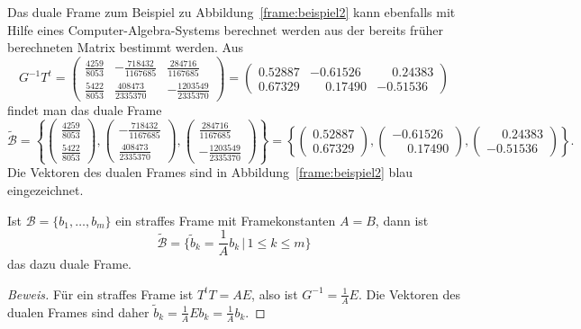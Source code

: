\begin{beispiel}
Das duale Frame zum Beispiel zu Abbildung~\ref{frame:beispiel2} kann
ebenfalls mit Hilfe eines Computer-Algebra-Systems berechnet werden aus
der bereits früher berechneten Matrix bestimmt werden.
Aus 
\[
G^{-1}T^t
=
\begin{pmatrix}
\frac{4259}{8053}
	&-\frac{718432}{1167685}
		&\frac{284716}{1167685}\\[2pt]
\frac{5422}{8053}
	&\frac{408473}{2335370}
		&-\frac{1203549}{2335370}
\end{pmatrix}
=
\begin{pmatrix}
0.52887&-0.61526&\phantom{-} 0.24383\\
0.67329&\phantom{-} 0.17490&-0.51536
\end{pmatrix}
\]
findet man das duale Frame
\[
\tilde{\mathcal{B}}
=
\left\{
\begin{pmatrix}
\frac{4259}{8053}\\[2pt]
\frac{5422}{8053}
\end{pmatrix},
\begin{pmatrix}
-\frac{718432}{1167685}\\[2pt]
\frac{408473}{2335370}
\end{pmatrix},
\begin{pmatrix}
\frac{284716}{1167685}\\[2pt]
-\frac{1203549}{2335370}
\end{pmatrix}
\right\}
=
\left\{
\begin{pmatrix} 0.52887\\ 0.67329 \end{pmatrix},
\begin{pmatrix}-0.61526\\ \phantom{-}0.17490 \end{pmatrix},
\begin{pmatrix}\phantom{-}0.24383\\ -0.51536 \end{pmatrix}
\right\}.
\]
Die Vektoren des dualen Frames sind in Abbildung~\ref{frame:beispiel2}
blau eingezeichnet.
\end{beispiel}

\begin{korollar}
Ist $\mathcal{B}=\{b_1,\dots,b_m\}$ ein straffes Frame mit Framekonstanten
$A=B$, dann ist
\[
\tilde{\mathcal{B}}
=
\biggl\{\tilde{b}_k = \frac1Ab_k\,\bigg|\,1\le k\le m\biggr\}
\]
das dazu duale Frame.
\end{korollar}

\begin{proof}[Beweis]
Für ein straffes Frame ist $T^tT=AE$, also ist $G^{-1}=\frac1A E$.
Die Vektoren des dualen Frames sind daher
$\tilde{b}_k = \frac1AEb_k=\frac1Ab_k$.
\end{proof}

